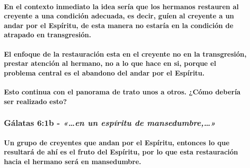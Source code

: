\documentclass[11a pt,twoside]{article}
\newcommand{\scripture}[1]{%
  {\fontsize{12pt}{16pt}\selectfont\ScriptureFont\itshape #1}%
}
\let\oldsubsubsection\subsubsection
\renewcommand{\subsubsection}{\needspace{4\baselineskip}\oldsubsubsection}
\let\oldparagraph\paragraph
\renewcommand{\paragraph}{\needspace{3\baselineskip}\oldparagraph}
\begin{document}
\paragraph{En el contexto inmediato la idea sería que los hermanos
restauren al creyente a una condición adecuada, es decir, guíen al
creyente a un andar por el Espíritu, de esta manera no estaría en la
condición de atrapado en
transgresión.}\label{en-el-contexto-inmediato-la-idea-seruxeda-que-los-hermanos-restauren-al-creyente-a-una-condiciuxf3n-adecuada-es-decir-guuxeden-al-creyente-a-un-andar-por-el-espuxedritu-de-esta-manera-no-estaruxeda-en-la-condiciuxf3n-de-atrapado-en-transgresiuxf3n.}

\paragraph{El enfoque de la restauración esta en el creyente no en la
transgresión, prestar atención al hermano, no a lo que hace en si,
porque el problema central es el abandono del andar por el
Espíritu.}\label{el-enfoque-de-la-restauraciuxf3n-esta-en-el-creyente-no-en-la-transgresiuxf3n-prestar-atenciuxf3n-al-hermano-no-a-lo-que-hace-en-si-porque-el-problema-central-es-el-abandono-del-andar-por-el-espuxedritu.}

\paragraph{Esto continua con el panorama de trato unos a otros. ¿Cómo
debería ser realizado
esto?}\label{esto-continua-con-el-panorama-de-trato-unos-a-otros.-cuxf3mo-deberuxeda-ser-realizado-esto}

\subsubsection{\texorpdfstring{Gálatas 6:1b -
\scripture{«…en un espíritu de mansedumbre,…»}}{Gálatas 6:1b - }}\label{guxe1latas-61b---en-un-espuxedritu-de-mansedumbre}

\paragraph{Un grupo de creyentes que andan por el Espíritu, entonces lo
que resultará de ahí es el fruto del Espíritu, por lo que esta
restauración hacia el hermano será en
mansedumbre.}\label{un-grupo-de-creyentes-que-andan-por-el-espuxedritu-entonces-lo-que-resultaruxe1-de-ahuxed-es-el-fruto-del-espuxedritu-por-lo-que-esta-restauraciuxf3n-hacia-el-hermano-seruxe1-en-mansedumbre.}
\end{document}
